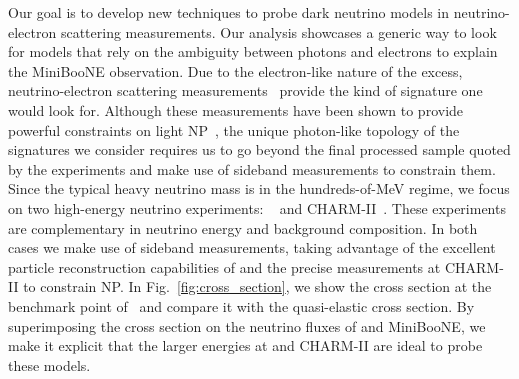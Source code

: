 Our goal is to develop new techniques to probe dark neutrino models in neutrino-electron scattering measurements. Our analysis showcases a generic way to look for models that rely on the ambiguity between photons and electrons to explain the MiniBooNE observation. Due to the electron-like nature of the excess, neutrino-electron scattering measurements~\cite{Auerbach:2001wg, Deniz:2009mu,Bellini:2011rx,Park:2013dax,Vilain:1994qy} provide the kind of signature one would look for. Although these measurements have been shown to provide powerful constraints on light NP~\cite{Pospelov:2017kep,Lindner:2018kjo,Magill:2018tbb}, the unique photon-like topology of the signatures we consider requires us to go beyond the final processed sample quoted by the experiments and make use of sideband measurements to constrain them.
Since the typical heavy neutrino mass is in the hundreds-of-MeV regime, we focus on two high-energy neutrino experiments: \minerva~\cite{Park:2013dax,Park:2015eqa,Valencia-Rodriguez:2016vkf} and CHARM-II~\cite{DeWinter:1989zg,Geiregat:1992zv,Vilain:1994qy}. These experiments are complementary in neutrino energy and background composition. In both cases we make use of sideband measurements, taking advantage of the excellent particle reconstruction capabilities of \minerva and the precise measurements at CHARM-II to constrain NP. In Fig.~\ref{fig:cross_section}, we show the cross section at the benchmark point of~\cite{Bertuzzo:2018ftf} and compare it with the quasi-elastic cross section. By superimposing the cross section on the neutrino fluxes of \minerva and MiniBooNE, we make it explicit that the larger energies at \minerva and CHARM-II are ideal to probe these models. 


